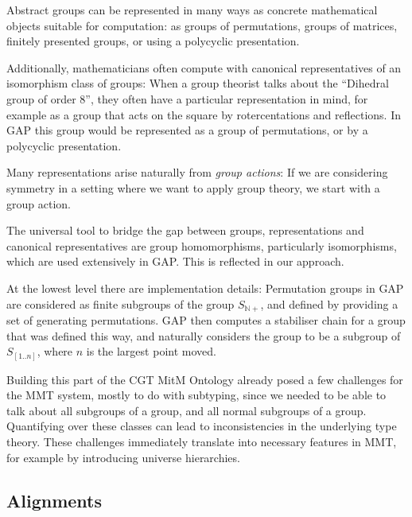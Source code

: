 \smallskip

Abstract groups can be represented in many ways as concrete mathematical
objects suitable for computation: as groups of permutations, groups of matrices,
finitely presented groups, or using a polycyclic presentation.

Additionally, mathematicians often compute with canonical representatives of an
isomorphism class of groups: When a group theorist talks about the ``Dihedral
group of order 8'', they often have a particular representation in
mind, for example as a group that acts on the square by rotercentations
and reflections. In GAP this group would be represented as a group of
permutations, or by a polycyclic presentation.

Many representations arise naturally from \emph{group actions}: If we are
considering symmetry in a setting where we want to apply group theory, we start
with a group action.

The universal tool to bridge the gap between groups, representations and
canonical representatives are group homomorphisms, particularly isomorphisms,
which are used extensively in GAP. This is reflected in our approach.

\smallskip

At the lowest level there are implementation details: Permutation groups in GAP
are considered as finite subgroups of the group $S_{\mathbb{N}+}$, and defined by
providing a set of generating permutations. GAP then computes a stabiliser chain
for a group that was defined this way, and naturally considers the group to be a
subgroup of $S_{[1..n]}$, where $n$ is the largest point moved.

\smallskip

Building this part of the CGT MitM Ontology already posed a few challenges for
the MMT system, mostly to do with subtyping, since we needed to be able to talk
about all subgroups of a group, and all normal subgroups of a group. Quantifying
over these classes can lead to inconsistencies in the underlying type theory.
These challenges immediately translate into necessary
features in MMT, for example by introducing universe hierarchies.

\subsection{Alignments}


